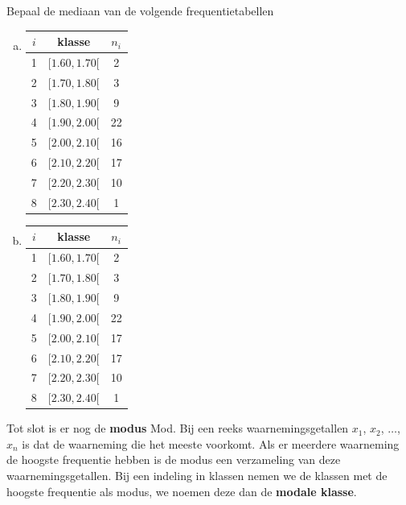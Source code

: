 \documentclass[12pt,twoside,a4paper]{article}
\begin{document}
\begin{oefening}
Bepaal de mediaan van de volgende frequentietabellen
\begin{multicols}{2}
\begin{enumerate}[(a)]
  \item
  \begin{center}
\begin{tabular}{c|c|c}
$i$ & klasse     & $n_i$\\
\hline
  1 & $[ 1.60,  1.70[$ &   2\\
  2 & $[ 1.70,  1.80[$ &   3\\
  3 & $[ 1.80,  1.90[$ &   9\\
  4 & $[ 1.90,  2.00[$ &   22\\
  5 & $[ 2.00,  2.10[$ &   16\\
  6 & $[ 2.10,  2.20[$ &   17\\
  7 & $[ 2.20,  2.30[$ &   10\\
  8 & $[ 2.30,  2.40[$ &   1\\
\end{tabular}
\end{center}
  \item
  \begin{center}
\begin{tabular}{c|c|c}
$i$ & klasse     & $n_i$\\
\hline
  1 & $[ 1.60,  1.70[$ &   2\\
  2 & $[ 1.70,  1.80[$ &   3\\
  3 & $[ 1.80,  1.90[$ &   9\\
  4 & $[ 1.90,  2.00[$ &   22\\
  5 & $[ 2.00,  2.10[$ &   17\\
  6 & $[ 2.10,  2.20[$ &   17\\
  7 & $[ 2.20,  2.30[$ &   10\\
  8 & $[ 2.30,  2.40[$ &   1\\
\end{tabular}
\end{center}
\end{enumerate}
\end{multicols}
\end{oefening}

Tot slot is er nog de {\bf modus} Mod. Bij een reeks waarnemingsgetallen $x_1$, $x_2$, $\ldots$, $x_n$ is dat de waarneming die het meeste voorkomt. Als er meerdere waarneming de hoogste frequentie hebben is de modus een verzameling van deze waarnemingsgetallen. Bij een indeling in klassen nemen we de klassen met de hoogste frequentie als modus, we noemen deze dan de {\bf modale klasse}.
\end{document}
